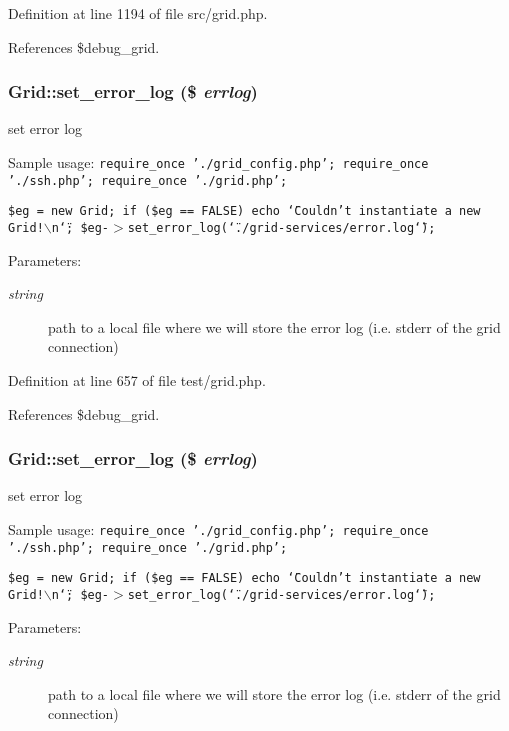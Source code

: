 Definition at line 1194 of file src/grid.php.

References \$debug\_\-grid.
\subsubsection{\setlength{\rightskip}{0pt plus 5cm}Grid::set\_\-error\_\-log (\$ {\em errlog})}\label{classGrid_a33}


set error log 

Sample usage: {\tt  require\_\-once './grid\_\-config.php'; require\_\-once './ssh.php'; require\_\-once './grid.php';}

{\tt  \$eg = new Grid; if (\$eg == FALSE) echo \char`\"{}Couldn't instantiate a new Grid!$\backslash$n\char`\"{}; \$eg-$>$set\_\-error\_\-log(\char`\"{}./grid-services/error.log\char`\"{}); }

\begin{Desc}
\item[Parameters:]
\begin{description}
\item[{\em string}]path to a local file where we will store the error log (i.e. stderr of the grid connection) \end{description}
\end{Desc}


Definition at line 657 of file test/grid.php.

References \$debug\_\-grid.
\subsubsection{\setlength{\rightskip}{0pt plus 5cm}Grid::set\_\-error\_\-log (\$ {\em errlog})}\label{classGrid_a7}


set error log 

Sample usage: {\tt  require\_\-once './grid\_\-config.php'; require\_\-once './ssh.php'; require\_\-once './grid.php';}

{\tt  \$eg = new Grid; if (\$eg == FALSE) echo \char`\"{}Couldn't instantiate a new Grid!$\backslash$n\char`\"{}; \$eg-$>$set\_\-error\_\-log(\char`\"{}./grid-services/error.log\char`\"{}); }

\begin{Desc}
\item[Parameters:]
\begin{description}
\item[{\em string}]path to a local file where we will store the error log (i.e. stderr of the grid connection) \end{description}
\end{Desc}


